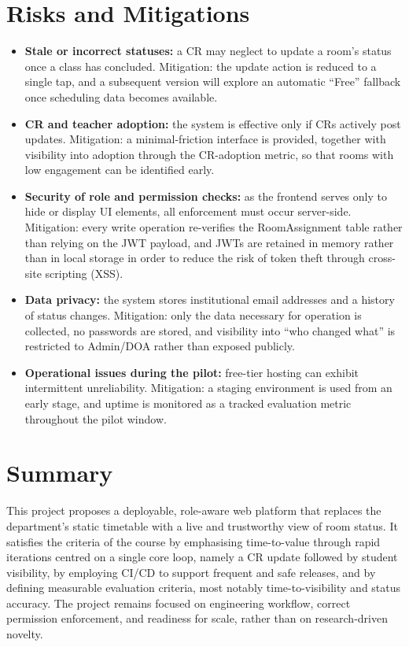 \documentclass[11pt]{article}
\begin{document}
\section{Risks and Mitigations}

\begin{itemize}
    \item \textbf{Stale or incorrect statuses:} a CR may neglect to update a room's status once a class has concluded. Mitigation: the update action is reduced to a single tap, and a subsequent version will explore an automatic ``Free'' fallback once scheduling data becomes available.
    \item \textbf{CR and teacher adoption:} the system is effective only if CRs actively post updates. Mitigation: a minimal-friction interface is provided, together with visibility into adoption through the CR-adoption metric, so that rooms with low engagement can be identified early.
    \item \textbf{Security of role and permission checks:} as the frontend serves only to hide or display UI elements, all enforcement must occur server-side. Mitigation: every write operation re-verifies the RoomAssignment table rather than relying on the JWT payload, and JWTs are retained in memory rather than in local storage in order to reduce the risk of token theft through cross-site scripting (XSS).
    \item \textbf{Data privacy:} the system stores institutional email addresses and a history of status changes. Mitigation: only the data necessary for operation is collected, no passwords are stored, and visibility into ``who changed what'' is restricted to Admin/DOA rather than exposed publicly.
    \item \textbf{Operational issues during the pilot:} free-tier hosting can exhibit intermittent unreliability. Mitigation: a staging environment is used from an early stage, and uptime is monitored as a tracked evaluation metric throughout the pilot window.
\end{itemize}

\section{Summary}

This project proposes a deployable, role-aware web platform that replaces the department's static timetable with a live and trustworthy view of room status. It satisfies the criteria of the course by emphasising time-to-value through rapid iterations centred on a single core loop, namely a CR update followed by student visibility, by employing CI/CD to support frequent and safe releases, and by defining measurable evaluation criteria, most notably time-to-visibility and status accuracy. The project remains focused on engineering workflow, correct permission enforcement, and readiness for scale, rather than on research-driven novelty.
\end{document}
